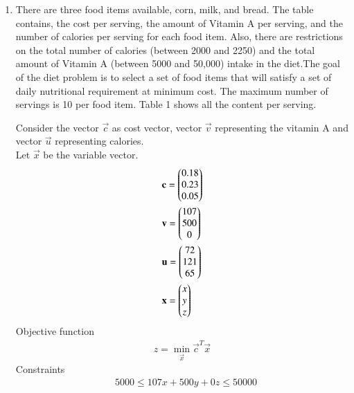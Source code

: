 \documentclass[journal,12pt,twocolumn]{IEEEtran}
\begin{document}
\begin{enumerate}
\item There are three food items available, corn, milk, and bread. The table contains,
the cost per serving, the amount of Vitamin A per serving, and the number of
calories per serving for each food item. Also, there are restrictions on the total
number of calories (between 2000 and 2250) and the total amount of Vitamin A
(between 5000 and 50,000) intake in the diet.The goal of the diet problem is to
select a set of food items that will satisfy a set of daily nutritional requirement
at minimum cost. The maximum number of servings is 10 per food item. Table 1 shows all the content per serving.\\
\begin{table}[H]
 \centering
 \caption{}
 \end{table}
\solution 
Consider the vector $\vec{c}$ as cost vector, vector $\vec{v}$ representing the vitamin A and vector $\vec{u}$ representing calories.\\
Let $\vec{x}$ be the variable vector.\\
\begin{align}
&\mathbf{c} = \begin{pmatrix}0.18\\0.23\\0.05\end{pmatrix}\\
& \mathbf{v} = \begin{pmatrix}107\\500\\0\end{pmatrix}\\
& \mathbf{u} = \begin{pmatrix}72\\121\\65\end{pmatrix}\\
&\mathbf{x} = \begin{pmatrix}x\\y\\z\end{pmatrix}
\end{align}
Objective function 
\begin{align}
z = \min_\vec{x} \vec{c}^T\vec{x}
\end{align}
Constraints
\begin{align}
&5000 \leq 107x+500y+0z \leq 50000\\

\end{align}
\end{enumerate}
\end{document}
